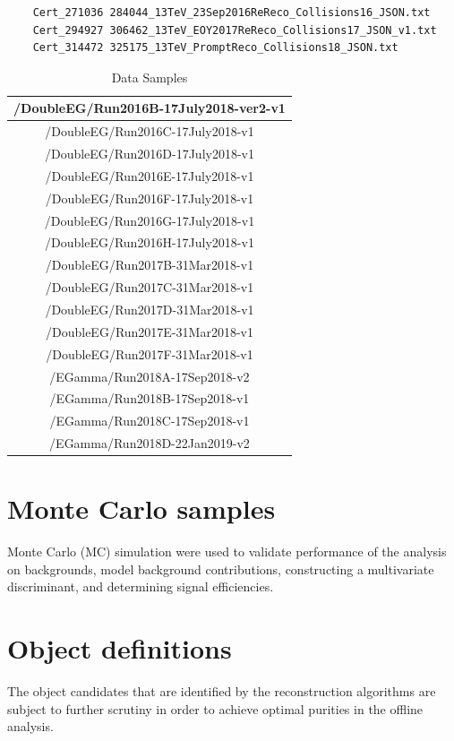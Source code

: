 \begin{verbatim}
	Cert_271036 284044_13TeV_23Sep2016ReReco_Collisions16_JSON.txt
	Cert_294927 306462_13TeV_EOY2017ReReco_Collisions17_JSON_v1.txt 
	Cert_314472 325175_13TeV_PromptReco_Collisions18_JSON.txt 
\end{verbatim} 

\begin{table}[h!]
	\centering
	\caption{Data Samples}
	\begin{tabular}{|c|}
		\hline
		/DoubleEG/Run2016B-17July2018-ver2-v1 \\
		\hline
		/DoubleEG/Run2016C-17July2018-v1 \\
		\hline
		/DoubleEG/Run2016D-17July2018-v1 \\
		\hline
		/DoubleEG/Run2016E-17July2018-v1 \\
		\hline
		/DoubleEG/Run2016F-17July2018-v1 \\
		\hline
		/DoubleEG/Run2016G-17July2018-v1 \\
		\hline
		/DoubleEG/Run2016H-17July2018-v1 \\
		\hline
		/DoubleEG/Run2017B-31Mar2018-v1 \\
		\hline
		/DoubleEG/Run2017C-31Mar2018-v1 \\
		\hline
		/DoubleEG/Run2017D-31Mar2018-v1 \\
		\hline
		/DoubleEG/Run2017E-31Mar2018-v1 \\
		\hline
		/DoubleEG/Run2017F-31Mar2018-v1 \\
		\hline
		/EGamma/Run2018A-17Sep2018-v2 \\
		\hline
		/EGamma/Run2018B-17Sep2018-v1 \\
		\hline
		/EGamma/Run2018C-17Sep2018-v1 \\
		\hline
		/EGamma/Run2018D-22Jan2019-v2 \\
		\hline
	\end{tabular}
	\label{table:DataSamples}
\end{table}




\section{Monte Carlo samples}
Monte Carlo (MC) simulation were used to validate performance of the analysis on backgrounds, model background contributions, constructing a multivariate discriminant, and determining signal efficiencies.   


\section{Object definitions}
The object candidates that are identified by the reconstruction algorithms are subject to further scrutiny in order to achieve optimal purities in the offline analysis.  

